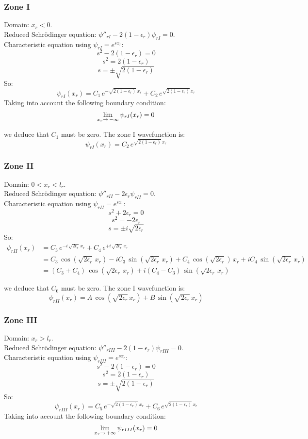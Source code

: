 \subsubsection{Zone I}
Domain: $x_r < 0$.\\
Reduced Schrödinger equation: $\psi''_{rI} - 2(1-\epsilon_r)\psi_{rI} = 0$.\\
Characteristic equation using $\psi_{rI}=e^{sx_r}$:
\[
s^2-2(1-\epsilon_r)=0
\]
\[
s^2=2(1-\epsilon_r)
\]
\[
s = \pm\sqrt{2(1-\epsilon_r)}
\]
So:
\[
\psi_{rI}(x_r)
 = C_1\,e^{-\sqrt{2(1-\epsilon_r)}\,x_r} + C_2\,e^{\sqrt{2(1-\epsilon_r)}\,x_r}
\]
Taking into account the following boundary condition:
\[
\lim_{\scriptsize x_r\to\, -\infty} \psi_{rI}(x_r) = 0
\]

we deduce that $C_1$ must be zero. The zone I wavefunction is:
\[
\psi_{rI}(x_r) = C_2\,e^{\sqrt{2(1-\epsilon_r)}\,x_r}
\]

\subsubsection{Zone II}
Domain: $0 < x_r < l_r$.\\
Reduced Schrödinger equation: $\psi''_{rII} - 2\epsilon_r\psi_{rII}= 0$.\\
Characteristic equation using $\psi_{rII}=e^{sx_r}$:
\[
s^2+2\epsilon_r=0
\]
\[
s^2=-2\epsilon_r
\]
\[
s = \pm i\sqrt{2\epsilon_r}
\]
So:
\begin{align*}
\psi_{rII}(x_r)
&=C_3\,e^{-i\,\sqrt{2\epsilon_r}\,x_r} + C_4\,e^{+i\,\sqrt{2\epsilon_r}\,x_r}\\
&=C_3\,\cos\left(\sqrt{2\epsilon_r}\,x_r\right)
 - i C_3\,\sin\left(\sqrt{2\epsilon_r}\,x_r\right)
 + C_4\,\cos\left(\sqrt{2\epsilon_r}\right)\,x_r 
 + i C_4\,\sin\left(\sqrt{2\epsilon_r}\,x_r\right)\\
&=(C_3+C_4)\,\cos\left(\sqrt{2\epsilon_r}\,x_r\right)
 + i (C_4-C_3)\,\sin\left(\sqrt{2\epsilon_r}\,x_r\right)
\end{align*}

we deduce that $C_6$ must be zero. The zone I wavefunction is:
\[
\psi_{rII}(x_r)
= A\,\cos\left(\sqrt{2\epsilon_r}\,x_r\right)
 + B\,\sin\left(\sqrt{2\epsilon_r}\,x_r\right)
\]

\subsubsection{Zone III}
Domain: $x_r > l_r$.\\
Reduced Schrödinger equation: $\psi''_{rIII} - 2(1-\epsilon_r)\psi_{rIII}= 0$.\\
Characteristic equation using $\psi_{rIII}=e^{sx_r}$:
\[
s^2-2(1-\epsilon_r)=0
\]
\[
s^2=2(1-\epsilon_r)
\]
\[
s = \pm\sqrt{2(1-\epsilon_r)}
\]
So:
\[
\psi_{rIII}(x_r)
 = C_5\,e^{-\sqrt{2(1-\epsilon_r)}\,x_r} + C_6\,e^{\sqrt{2(1-\epsilon_r)}\,x_r}
\]
Taking into account the following boundary condition:
\[
\lim_{\scriptsize x_r\to\, +\infty} \psi_{rIII}(x_r) = 0
\]

